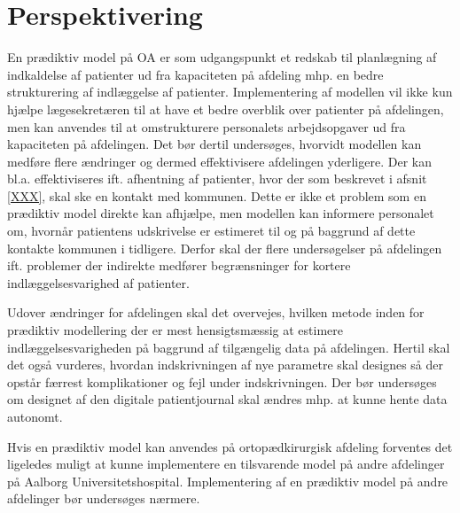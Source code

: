 \section{Perspektivering} 
En prædiktiv model på OA er som udgangspunkt et redskab til planlægning af indkaldelse af patienter ud fra kapaciteten på afdeling mhp. en bedre strukturering af indlæggelse af patienter. Implementering af modellen vil ikke kun hjælpe lægesekretæren til at have et bedre overblik over patienter på afdelingen, men kan anvendes til at omstrukturere personalets arbejdsopgaver ud fra kapaciteten på afdelingen. Det bør dertil undersøges, hvorvidt modellen kan medføre flere ændringer og dermed effektivisere afdelingen yderligere. Der kan bl.a. effektiviseres ift. afhentning af patienter, hvor der som beskrevet i afsnit \ref{XXX}, skal ske en kontakt med kommunen. Dette er ikke et problem som en prædiktiv model direkte kan afhjælpe, men modellen kan informere personalet om, hvornår patientens udskrivelse er estimeret til og på baggrund af dette kontakte kommunen i tidligere. Derfor skal der flere undersøgelser på afdelingen ift. problemer der indirekte medfører begrænsninger for kortere indlæggelsesvarighed af patienter. 


Udover ændringer for afdelingen skal det overvejes, hvilken metode inden for prædiktiv modellering der er mest hensigtsmæssig at estimere indlæggelsesvarigheden på baggrund af tilgængelig data på afdelingen. Hertil skal det også vurderes, hvordan indskrivningen af nye parametre skal designes så der opstår færrest komplikationer og fejl under indskrivningen. Der bør undersøges om designet af den digitale patientjournal skal ændres mhp. at kunne hente data autonomt. 


Hvis en prædiktiv model kan anvendes på ortopædkirurgisk afdeling forventes det ligeledes muligt at kunne implementere en tilsvarende model på andre afdelinger på Aalborg Universitetshospital. Implementering af en prædiktiv model på andre afdelinger bør undersøges nærmere. 
